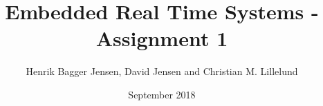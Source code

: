 \documentclass{article}
\title{Embedded Real Time Systems - Assignment 1}
\author{Henrik Bagger Jensen, David Jensen and Christian M. Lillelund}
\date{September 2018}
\begin{document}
\maketitle
\pagebreak
\tableofcontents
\pagebreak





\tableofcontents
\pagebreak

{}
\end{document}
